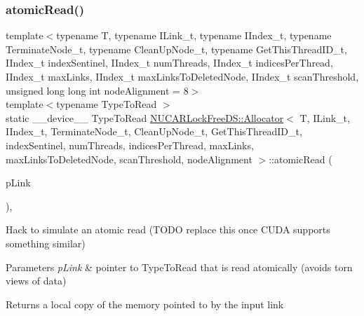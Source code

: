 \subsubsection{\texorpdfstring{atomic\+Read()}{atomicRead()}}
{\footnotesize\ttfamily template$<$typename T, typename I\+Link\+\_\+t, typename I\+Index\+\_\+t, typename Terminate\+Node\+\_\+t, typename Clean\+Up\+Node\+\_\+t, typename Get\+This\+Thread\+I\+D\+\_\+t, I\+Index\+\_\+t index\+Sentinel, I\+Index\+\_\+t num\+Threads, I\+Index\+\_\+t indices\+Per\+Thread, I\+Index\+\_\+t max\+Links, I\+Index\+\_\+t max\+Links\+To\+Deleted\+Node, I\+Index\+\_\+t scan\+Threshold, unsigned long long int node\+Alignment = 8$>$ \\
template$<$typename Type\+To\+Read $>$ \\
static \+\_\+\+\_\+device\+\_\+\+\_\+ Type\+To\+Read \mbox{\hyperlink{class_n_u_c_a_r_lock_free_d_s_1_1_allocator}{N\+U\+C\+A\+R\+Lock\+Free\+D\+S\+::\+Allocator}}$<$ T, I\+Link\+\_\+t, I\+Index\+\_\+t, Terminate\+Node\+\_\+t, Clean\+Up\+Node\+\_\+t, Get\+This\+Thread\+I\+D\+\_\+t, index\+Sentinel, num\+Threads, indices\+Per\+Thread, max\+Links, max\+Links\+To\+Deleted\+Node, scan\+Threshold, node\+Alignment $>$\+::atomic\+Read (\begin{DoxyParamCaption}\item[{Type\+To\+Read $\ast$}]{p\+Link }\end{DoxyParamCaption})\hspace{0.3cm}{\ttfamily [inline]}, {\ttfamily [static]}}

Hack to simulate an atomic read (T\+O\+DO replace this once C\+U\+DA supports something similar) 
\begin{DoxyParams}{Parameters}
{\em p\+Link} & pointer to Type\+To\+Read that is read atomically (avoids torn views of data) \\
\hline
\end{DoxyParams}
\begin{DoxyReturn}{Returns}
a local copy of the memory pointed to by the input link 
\end{DoxyReturn}
\mbox{\label{class_n_u_c_a_r_lock_free_d_s_1_1_allocator_abb86daaaec98eadd094bc3f6520bb1d8}} 
